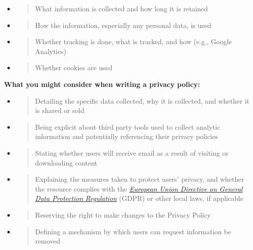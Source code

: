 \documentclass[]{article}
\begin{document}
\begin{itemize}
\item
  \begin{quote}
  What information is collected and how long it is retained
  \end{quote}
\item
  \begin{quote}
  How the information, especially any personal data, is used
  \end{quote}
\item
  \begin{quote}
  Whether tracking is done, what is tracked, and how (e.g., Google
  Analytics)
  \end{quote}
\item
  \begin{quote}
  Whether cookies are used
  \end{quote}
\end{itemize}

\textbf{What you might consider when writing a privacy policy:}

\begin{itemize}
\item
  \begin{quote}
  Detailing the specific data collected, why it is collected, and
  whether it is shared or sold
  \end{quote}
\item
  \begin{quote}
  Being explicit about third party tools used to collect analytic
  information and potentially referencing their privacy policies
  \end{quote}
\item
  \begin{quote}
  Stating whether users will receive email as a result of visiting or
  downloading content
  \end{quote}
\item
  \begin{quote}
  Explaining the measures taken to protect users' privacy, and whether
  the resource complies with the
  \href{https://gdpr-info.eu/}{\emph{European Union Directive on General
  Data Protection Regulation}} (GDPR) or other local laws, if applicable
  \end{quote}
\item
  \begin{quote}
  Reserving the right to make changes to the Privacy Policy
  \end{quote}
\item
  \begin{quote}
  Defining a mechanism by which users can request information be removed
  \end{quote}
\end{itemize}
\end{document}

